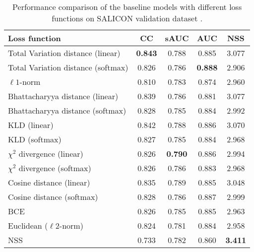 \begin{table}[]
	\centering
	\scriptsize
	\caption{Performance comparison of the baseline models with different loss functions on SALICON validation dataset \cite{jiang2015salicon}.}
	\label{table:losscompare}
	\begin{tabular}{|l|c c c c|}
		\hline
		Loss function                      & CC    & sAUC  & AUC   & NSS   \\ \hline \hline
		Total Variation distance (linear)  & \textbf{0.843} & 0.788 & 0.885 & 3.077 \\ \hline
		Total Variation distance (softmax) & 0.826 & 0.786 & \textbf{0.888} & 2.906 \\ \hline
		$\ell1$-norm                & 0.810  & 0.783 & 0.874 & 2.960  \\ \hline \hline
		Bhattacharyya distance (linear)    & 0.839 & 0.786 & 0.881 & 3.077 \\ \hline
		Bhattacharyya distance (softmax)   & 0.828 & 0.785 & 0.884 & 2.992 \\ \hline \hline
		KLD (linear)             & 0.842 & 0.788 & 0.886 & 3.070  \\ \hline
		KLD (softmax)            & 0.827 & 0.785 & 0.884 & 2.968 \\ \hline\hline
		$\chi^2$ divergence (linear)             & 0.826 & \textbf{0.790}  & 0.886 & 2.994 \\ \hline
		$\chi^2$ divergence (softmax)            & 0.826 & 0.786 & 0.883 & 2.968 \\ \hline \hline
		Cosine distance (linear)           & 0.835 & 0.789 & 0.885 & 3.048 \\ \hline
		Cosine distance (softmax)          & 0.828 & 0.786 & 0.887 & 2.999 \\ \hline \hline
		BCE               & 0.826 & 0.785 & 0.885 & 2.963 \\ \hline
		Euclidean ($\ell2$-norm)                          & 0.824 & 0.781 & 0.884 & 2.958 \\ \hline\hline
		NSS                                & 0.733 & 0.782 & 0.860  & \textbf{3.411} \\ \hline
	\end{tabular}
\end{table} 





